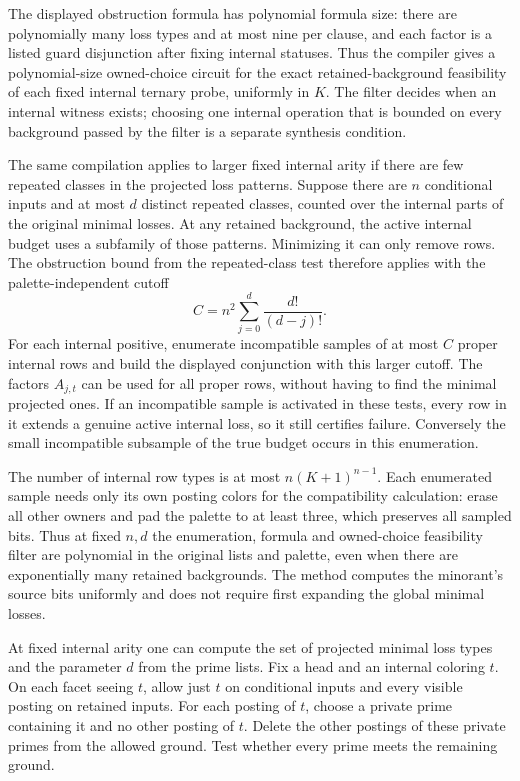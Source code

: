 The displayed obstruction formula has polynomial
formula size: there are polynomially many loss
types and at most nine per clause, and each
factor is a listed guard disjunction after
fixing internal statuses. Thus the compiler
gives a polynomial-size owned-choice circuit
for the exact retained-background feasibility
of each fixed internal ternary probe, uniformly
in $K$. The filter decides when an internal
witness exists; choosing one internal operation
that is bounded on every background passed by
the filter is a separate synthesis condition.

The same compilation applies to larger fixed
internal arity if there are few repeated
classes in the projected loss patterns.
Suppose there are $n$ conditional inputs
and at most $d$ distinct repeated classes,
counted over the internal parts of the
original minimal losses. At any retained
background, the active internal budget
uses a subfamily of those patterns.
Minimizing it can only remove rows.
The obstruction bound from the
repeated-class test therefore applies
with the palette-independent cutoff
\[
             C=n^2\sum_{j=0}^{d}\frac{d!}{(d-j)!}.
\]
For each internal positive, enumerate
incompatible samples of at most $C$
proper internal rows and build the
displayed conjunction with this larger
cutoff. The factors $A_{j,t}$ can be
used for all proper rows, without having
to find the minimal projected ones.
If an incompatible sample is activated
in these tests, every row in it extends
a genuine active internal loss, so it
still certifies failure. Conversely the
small incompatible subsample of the
true budget occurs in this enumeration.

The number of internal row types is at
most $n(K+1)^{n-1}$. Each enumerated sample
needs only its own posting colors for
the compatibility calculation: erase
all other owners and pad the palette
to at least three, which preserves all
sampled bits. Thus at fixed $n,d$ the
enumeration, formula and owned-choice
feasibility filter are polynomial in
the original lists and palette, even
when there are exponentially many
retained backgrounds. The method
computes the minorant's source bits
uniformly and does not require first
expanding the global minimal losses.

At fixed internal arity one can compute
the set of projected minimal loss types
and the parameter $d$ from the prime
lists. Fix a head and an internal
coloring $t$. On each facet seeing $t$,
allow just $t$ on conditional inputs
and every visible posting on retained
inputs. For each posting of $t$, choose
a private prime containing it and no
other posting of $t$. Delete the other
postings of these private primes from
the allowed ground. Test whether every
prime meets the remaining ground.

